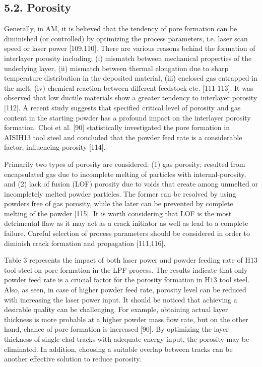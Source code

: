 \documentclass[10pt]{article}
\begin{document}
\subsection*{5.2. Porosity}
Generally, in AM, it is believed that the tendency of pore formation can be diminished (or controlled) by optimizing the process parameters, i.e. laser scan speed or laser power [109,110]. There are various reasons behind the formation of interlayer porosity including; (i) mismatch between mechanical properties of the underlying layer, (ii) mismatch between thermal elongation due to sharp temperature distribution in the deposited material, (iii) enclosed gas entrapped in the melt, (iv) chemical reaction between different feedstock etc. [111-113]. It was observed that low ductile materials show a greater tendency to interlayer porosity [112]. A recent study suggests that specified critical level of porosity and gas content in the starting powder has a profound impact on the interlayer porosity formation. Choi et al. [90] statistically investigated the pore formation in AISIH13 tool steel and concluded that the powder feed rate is a considerable factor, influencing porosity [114].

Primarily two types of porosity are considered: (1) gas porosity; resulted from encapsulated gas due to incomplete melting of particles with internal-porosity, and (2) lack of fusion (LOF) porosity due to voids that create among unmelted or incompletely melted powder particles. The former can be resolved by using powders free of gas porosity, while the later can be prevented by complete melting of the powder [115]. It is worth considering that LOF is the most detrimental flaw as it may act as a crack initiator as well as lead to a complete failure. Careful selection of process parameters should be considered in order to diminish crack formation and propagation [111,116].

Table 3 represents the impact of both laser power and powder feeding rate of $\mathrm{H} 13$ tool steel on pore formation in the LPF process. The results indicate that only powder feed rate is a crucial factor for the porosity formation in $\mathrm{H} 13$ tool steel. Also, as seen, in case of higher powder feed rate, porosity level can be reduced with increasing the laser power input. It should be noticed that achieving a desirable quality can be challenging. For example, obtaining actual layer thickness is more probable at a higher powder mass flow rate, but on the other hand, chance of pore formation is increased [90]. By optimizing the layer thickness of single clad tracks with adequate energy input, the porosity may be eliminated. In addition, choosing a suitable overlap between tracks can be another effective solution to reduce porosity.
\end{document}
